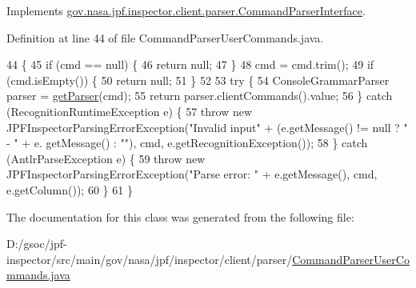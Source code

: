 Implements \hyperlink{interfacegov_1_1nasa_1_1jpf_1_1inspector_1_1client_1_1parser_1_1_command_parser_interface_a14ea3eaa90add073b3248a9792a26ca9}{gov.\+nasa.\+jpf.\+inspector.\+client.\+parser.\+Command\+Parser\+Interface}.



Definition at line 44 of file Command\+Parser\+User\+Commands.\+java.


\begin{DoxyCode}
44                                                                                                     \{
45     \textcolor{keywordflow}{if} (cmd == null) \{
46       \textcolor{keywordflow}{return} null;
47     \}
48     cmd = cmd.trim();
49     \textcolor{keywordflow}{if} (cmd.isEmpty()) \{
50       \textcolor{keywordflow}{return} null;
51     \}
52 
53     \textcolor{keywordflow}{try} \{
54       ConsoleGrammarParser parser = \hyperlink{classgov_1_1nasa_1_1jpf_1_1inspector_1_1client_1_1parser_1_1_command_parser_a4f3a71d89c26fff8ef0f3aa1d5c037be}{getParser}(cmd);
55       \textcolor{keywordflow}{return} parser.clientCommands().value;
56     \} \textcolor{keywordflow}{catch} (RecognitionRuntimeException e) \{
57       \textcolor{keywordflow}{throw} \textcolor{keyword}{new} JPFInspectorParsingErrorException(\textcolor{stringliteral}{"Invalid input"} + (e.getMessage() != null ? \textcolor{stringliteral}{" - "} + e.
      getMessage() : \textcolor{stringliteral}{""}), cmd, e.getRecognitionException());
58     \} \textcolor{keywordflow}{catch} (AntlrParseException e) \{
59       \textcolor{keywordflow}{throw} \textcolor{keyword}{new} JPFInspectorParsingErrorException(\textcolor{stringliteral}{"Parse error: "} + e.getMessage(), cmd, e.getColumn());
60     \}
61   \}
\end{DoxyCode}


The documentation for this class was generated from the following file\+:\begin{DoxyCompactItemize}
\item 
D\+:/gsoc/jpf-\/inspector/src/main/gov/nasa/jpf/inspector/client/parser/\hyperlink{_command_parser_user_commands_8java}{Command\+Parser\+User\+Commands.\+java}\end{DoxyCompactItemize}
